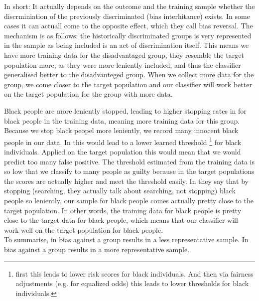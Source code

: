 In short: It actually depends on the outcome and the training sample whether the discrminiation of the previously discriminated (bias interhitance) exists. In some cases it can actuall come to the opposite effect, which they call bias reversal.
The mechanism is as follows: the historically discriminated groups is very represented in the sample as being included is an act of discrimination itself. This means we have more training data for the disadvantaged group, they resemble the target population more, as they were more leniently included, and thus the classifier generalised better to the disadvanteged group.
When we collect more data for the group, we come closer to the target population and our classifier will work better on the target population for the group with more data.


Black people are more leniently stopped, leading to higher stopping rates in for black people in the training data, meaning
more training data for this group. Because we stop black peopel more leniently, we record many innocent black people in our data.
In \cite{kallus} this would lead to a lower learned threshold \footnote{first this leads to lower risk scores for black individuals. And then via fairness adjustments (e.g. for equalized odds) this leads to lower thresholds for black individuals.}
for black individuals. Applied on the target population this would mean that we would predict too many false positive. The threshold estimated from the training 
data is so low that we classify to many people as guilty because in the target populations the scores are actually higher and meet the threshold easily.
In \cite{RambachanBBOEFW} they say that by stopping (searching, they actually talk about searching, not stopping) black people so leniently, our sample for black people comes actually pretty
close to the target population.
In other words, the training data for black people is pretty close to the target data for black people, which means that our classifier will work well on the
target population for black people. \\
To summarise, in \cite{kallus} bias against a group results in a less representative sample. In \cite{RambachanBBOEFW} bias against a group results in a more representative sample.


